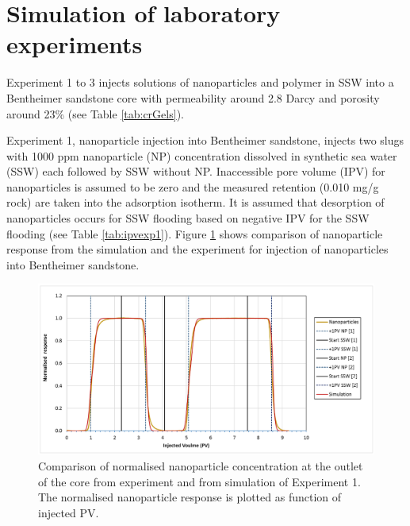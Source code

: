\section{Simulation of laboratory experiments}

Experiment 1 to 3 injects solutions of nanoparticles and polymer in SSW into a Bentheimer sandstone core with permeability around 2.8 Darcy and porosity around 23\% (see Table \ref{tab:crGels}).

Experiment 1, nanoparticle injection into Bentheimer sandstone, injects two slugs with 1000 ppm nanoparticle (NP) concentration dissolved in synthetic sea water (SSW) each followed by SSW without NP. Inaccessible pore volume (IPV) for nanoparticles is assumed to be zero and the measured retention (0.010 mg/g rock) are taken into the adsorption isotherm. It is assumed that desorption of nanoparticles occurs for SSW flooding based on negative IPV for the SSW flooding (see Table \ref{tab:ipvexp1}). Figure \ref{cht:simExpNP} shows comparison of nanoparticle response from the simulation and the experiment for injection of nanoparticles into Bentheimer sandstone.

\begin{figure}[h]
    \centering
    \includegraphics[width=\textwidth]{img/cht/simExpNP.png}
    \caption{Comparison of normalised nanoparticle concentration at the outlet of the core from experiment and from simulation of Experiment 1. The normalised nanoparticle response is plotted as function of injected PV.}
    \label{cht:simExpNP}
\end{figure}

